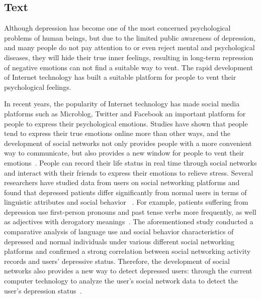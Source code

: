 
\ifx\allfiles\undefined
    
\fi

\subsection{Text}
\label{sec_approach}
Although depression has become one of the most concerned psychological problems of human beings, but due to the limited public awareness of depression, and many people do not pay attention to or even reject mental and psychological diseases, they will hide their true inner feelings, resulting in long-term repression of negative emotions can not find a suitable way to vent. The rapid development of Internet technology has built a suitable platform for people to vent their psychological feelings. 

In recent years, the popularity of Internet technology has made social media platforms such as Microblog, Twitter and Facebook an important platform for people to express their psychological emotions. Studies have shown that people tend to express their true emotions online more than other ways, and the development of social networks not only provides people with a more convenient way to communicate, but also provides a new window for people to vent their emotions~\cite{chancellor2020methods}. People can record their life status in real time through social networks and interact with their friends to express their emotions to relieve stress.
Several researchers have studied data from users on social networking platforms and found that depressed patients differ significantly from normal users in terms of linguistic attributes and social behavior ~\cite{chancellor2016quantifying,de2014mental,nguyen2014affective,wolohan2018detecting}. For example, patients suffering from depression use first-person pronouns and past tense verbs more frequently, as well as adjectives with derogatory meanings~\cite{rude2004language,nadeem2016identifying}.
The aforementioned study conducted a comparative analysis of language use and social behavior characteristics of depressed and normal individuals under various different social networking platforms and confirmed a strong correlation between social networking activity records and users' depressive status.
Therefore, the development of social networks also provides a new way to detect depressed users: through the current computer technology to analyze the user's social network data to detect the user's depression status~\cite{de2013predicting,magami2020automatic}.

